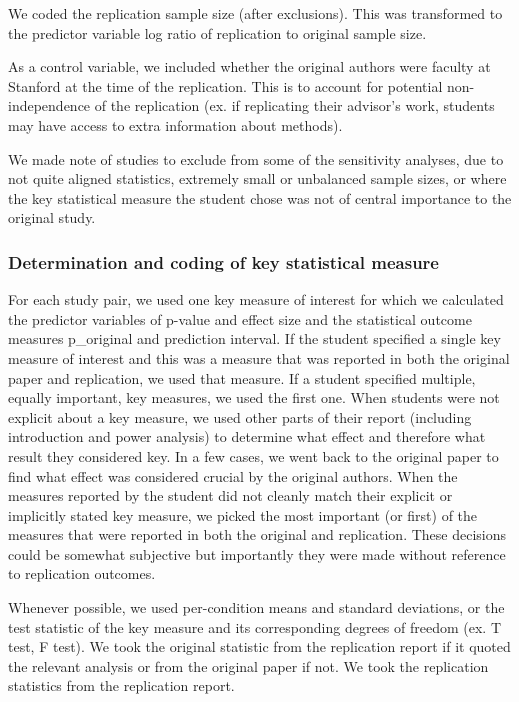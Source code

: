 \documentclass[
  english,
  a4paper,
]{article}
\begin{document}
We coded the replication sample size (after exclusions). This was transformed to the predictor variable log ratio of replication to original sample size.

As a control variable, we included whether the original authors were faculty at Stanford at the time of the replication. This is to account for potential non-independence of the replication (ex. if replicating their advisor's work, students may have access to extra information about methods).

We made note of studies to exclude from some of the sensitivity analyses, due to not quite aligned statistics, extremely small or unbalanced sample sizes, or where the key statistical measure the student chose was not of central importance to the original study.

\hypertarget{determination-and-coding-of-key-statistical-measure}{%
\subsubsection{Determination and coding of key statistical measure}\label{determination-and-coding-of-key-statistical-measure}}

For each study pair, we used one key measure of interest for which we calculated the predictor variables of p-value and effect size and the statistical outcome measures p\_original and prediction interval.
If the student specified a single key measure of interest and this was a measure that was reported in both the original paper and replication, we used that measure. If a student specified multiple, equally important, key measures, we used the first one. When students were not explicit about a key measure, we used other parts of their report (including introduction and power analysis) to determine what effect and therefore what result they considered key. In a few cases, we went back to the original paper to find what effect was considered crucial by the original authors. When the measures reported by the student did not cleanly match their explicit or implicitly stated key measure, we picked the most important (or first) of the measures that were reported in both the original and replication. These decisions could be somewhat subjective but importantly they were made without reference to replication outcomes.

Whenever possible, we used per-condition means and standard deviations, or the test statistic of the key measure and its corresponding degrees of freedom (ex. T test, F test). We took the original statistic from the replication report if it quoted the relevant analysis or from the original paper if not. We took the replication statistics from the replication report.
\end{document}
